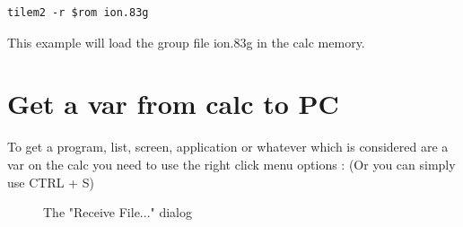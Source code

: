 \documentclass[10pt]{report}
\begin{document}
\begin{lstlisting}
tilem2 -r $rom ion.83g
\end{lstlisting}
This example will load the group file ion.83g in the calc memory.\newline

\section{Get a var from calc to PC}

To get a program, list, screen, application or whatever which is considered are a var on the calc you need to use the right click menu options :\newline
(Or you can simply use CTRL + S)\newline

\begin{figure}[H]
\centering
{}
\caption{The "Receive File..." dialog}
\end{figure}
\end{document}
